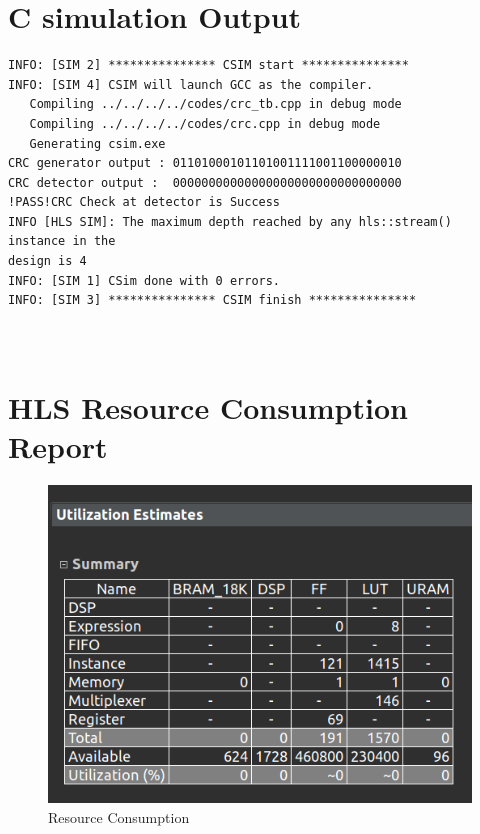 \documentclass{article}
\begin{document}
\section{C simulation Output}
\begin{lstlisting}
INFO: [SIM 2] *************** CSIM start ***************
INFO: [SIM 4] CSIM will launch GCC as the compiler.
   Compiling ../../../../codes/crc_tb.cpp in debug mode
   Compiling ../../../../codes/crc.cpp in debug mode
   Generating csim.exe
CRC generator output : 01101000101101001111001100000010
CRC detector output :  00000000000000000000000000000000
!PASS!CRC Check at detector is Success
INFO [HLS SIM]: The maximum depth reached by any hls::stream() instance in the
design is 4
INFO: [SIM 1] CSim done with 0 errors.
INFO: [SIM 3] *************** CSIM finish ***************



\end{lstlisting}
\vspace{15cm}

\section{HLS Resource Consumption Report}
\vspace{1cm}
\begin{figure}[h]
\centering
\includegraphics[width=\textwidth]{figs/p11.png}
    \caption{Resource Consumption}
    \label{fig:my_label}
\end{figure}

\vspace{13cm}
\end{document}
